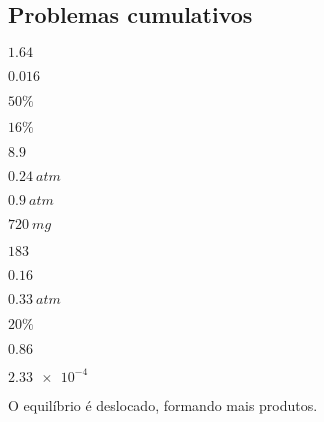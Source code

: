 \subsection*{Problemas cumulativos}
\small 
\begin{answers}
[start = 39]\item \(\num{1,64}\)

\item \(\num{0,016}\)

\item \(50\%\)

\item \(16\%\)

\item 
\begin{answers}
[start = 1]\item \(\num{8,9}\)

\item \(\qty{0,24}{\unit{atm}}\)

\end{answers}

\item \(\qty{0,9}{\unit{atm}}\)

\item 
\begin{answers}
[start = 1]\item \(\qty{720}{\unit{mg}}\)

\item \(\num{183}\)

\end{answers}

\item 
\begin{answers}
[start = 1]\item \(\num{0,16}\)

\item \(\qty{0,33}{\unit{atm}}\)

\item \(\num{20}\%\)

\end{answers}

\item \(\num{0,86}\)

\item 
\begin{answers}
[start = 1]\item \(\num{2,33e-4}\)

\item O equilíbrio é deslocado, formando mais produtos.


\end{answers}
\end{answers}
